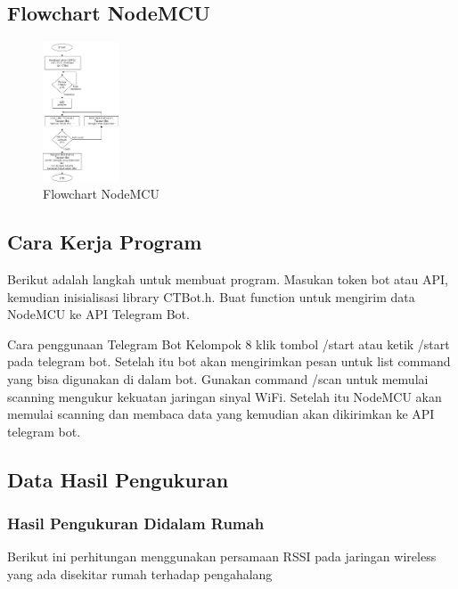 \documentclass[conference]{IEEEtran}
\begin{document}
\subsection{Flowchart NodeMCU}
\begin{figure}[h]
    \centering
    \includegraphics[width=0.2\textwidth]{Flowchart NodeMCU telegram bot.png}
    \caption{Flowchart NodeMCU}
\end{figure}
\vspace{1cm}
\subsection{Cara Kerja Program}
Berikut adalah langkah untuk membuat program. Masukan token bot atau API, kemudian inisialisasi library CTBot.h. Buat function untuk mengirim data NodeMCU ke API Telegram Bot.

Cara penggunaan Telegram Bot Kelompok 8 klik tombol /start atau ketik /start pada telegram bot. Setelah itu bot akan mengirimkan pesan untuk list command yang bisa digunakan di dalam bot.
Gunakan command /scan untuk memulai scanning mengukur kekuatan jaringan sinyal WiFi.
Setelah itu NodeMCU akan memulai scanning dan membaca data yang kemudian akan dikirimkan ke API telegram bot.
\subsection{Data Hasil Pengukuran}
\subsubsection{Hasil Pengukuran Didalam Rumah}
Berikut ini perhitungan menggunakan persamaan RSSI 
pada jaringan wireless yang ada disekitar rumah terhadap pengahalang
\end{document}
